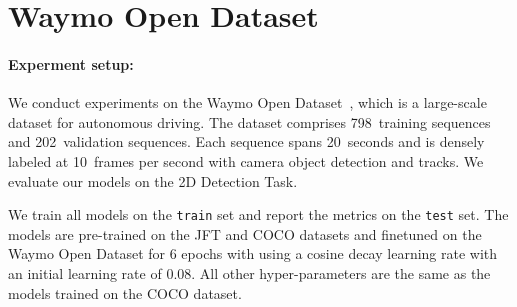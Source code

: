 \documentclass[final]{cvpr}
\begin{document}


\section{Waymo Open Dataset}
\paragraph{Experment setup:}
We conduct experiments on the Waymo Open Dataset~\cite{waymo_open_dataset}, which is a large-scale dataset for autonomous driving. The dataset comprises 798~training sequences and 202~validation sequences. Each sequence spans 20~seconds and is densely labeled at 10~frames per second with camera object detection and tracks. We evaluate our models on the 2D Detection Task. 

We train all models on the \texttt{train} set and report the metrics on the \texttt{test} set. The models are pre-trained on the JFT and COCO datasets and finetuned on the Waymo Open Dataset for 6 epochs with using a cosine decay learning rate with an initial learning rate of 0.08. All other hyper-parameters are the same as the models trained on the COCO dataset.
\end{document}
